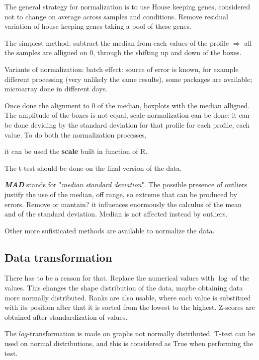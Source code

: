 	The general strategy for normalization is to use
	House keeping genes,
	considered not to change on average across samples and
	conditions. Remove residual variation of house keeping genes taking a pool of these genes.

	The simplest method: subtract the median from each values of the profile $\Rightarrow$ all the samples are alligned on  $0$, through the shifting up and down of the boxes. 

	Variants of normalization: batch effect: source of error is known, for example different processing (very unlikely the same results), some packages are available; microarray done in different days.

	Once done the alignment to 0 of the median, boxplots with the median alligned. The amplitude of the boxes is not equal, scale normalization can be done: it can be done deviding by the standard deviation for that profile for each profile, each value. To do both the normalization processes, 

	it can be used the \textbf{scale} built in function of R.  

	The t-test should be done on the final version of the data. 

	\textbf{\textit{MAD}} stands for "\textit{median standard deviation}". The possible presence of outliers justify the use of the median, off range, so extreme that can be produced by errors. Remove or mantain? it influences enormously the calculus of the mean and of the standard deviation. Median is not affected instead by outliers.

	Other more sufisticated methods are available to normalize the data. 

	\subsection{Data transformation}
	There has to be a reason for that.
	Replace the numerical values with $ \log $ of the values. This changes the shape distribution of the data, maybe obtaining data more normally distributed. Ranks are also usable, where each value is substitued with its position after that it is sorted from the lowest to the highest.
	Z-scores are obtained after standardization of values.

	The $ log $-transformation is made on graphs not normally distributed. T-test can be used on normal distributions, and this is considered as True when performing the test.

